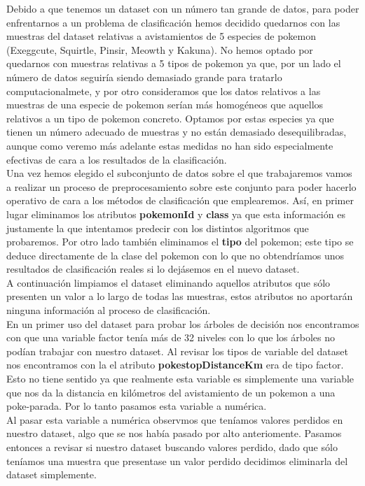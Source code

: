 Debido a que tenemos un dataset con un número tan grande de datos, para poder enfrentarnos a un problema de clasificación hemos decidido quedarnos con las muestras del dataset relativas a avistamientos de 5 especies de pokemon (Exeggcute, Squirtle, Pinsir, Meowth y Kakuna). No hemos optado por quedarnos con muestras relativas a 5 tipos de pokemon ya que, por un lado el número de datos seguiría siendo demasiado grande para tratarlo computacionalmete, y por otro consideramos que los datos relativos a las muestras de una especie de pokemon serían más homogéneos que aquellos relativos a un tipo de pokemon concreto. Optamos por estas especies ya que tienen un número adecuado de muestras y no están demasiado desequilibradas, aunque como veremo más adelante estas medidas no han sido especialmente efectivas de cara a los resultados de la clasificación.\\

Una vez hemos elegido el subconjunto de datos sobre el que trabajaremos vamos a realizar un proceso de preprocesamiento sobre este conjunto para poder hacerlo operativo de cara a los métodos de clasificación que emplearemos. Así, en primer lugar eliminamos los atributos \textbf{pokemonId} y \textbf{class} ya que esta información es justamente la que intentamos predecir con los distintos algoritmos que probaremos. Por otro lado también eliminamos el \textbf{tipo} del pokemon; este tipo se deduce directamente de la clase del pokemon con lo que no obtendríamos unos resultados de clasificación reales si lo dejásemos en el nuevo dataset.\\

A continuación limpiamos el dataset eliminando aquellos atributos que sólo presenten un valor a lo largo de todas las muestras, estos atributos no aportarán ninguna información al proceso de clasificación.\\

En un primer uso del dataset para probar los árboles de decisión nos encontramos con que una variable factor tenía más de 32 niveles con lo que los árboles no podían trabajar con nuestro dataset. Al revisar los tipos de variable del dataset nos encontramos con la el atributo \textbf{pokestopDistanceKm} era de tipo factor. Esto no tiene sentido ya que realmente esta variable es simplemente una variable que nos da la distancia en kilómetros del avistamiento de un pokemon a una poke-parada. Por lo tanto pasamos esta variable a numérica.\\

Al pasar esta variable a numérica observmos que teníamos valores perdidos en nuestro dataset, algo que se nos había pasado por alto anteriomente. Pasamos entonces a revisar si nuestro dataset buscando valores perdido, dado que sólo teníamos una muestra que presentase un valor perdido decidimos eliminarla del dataset simplemente.\\

